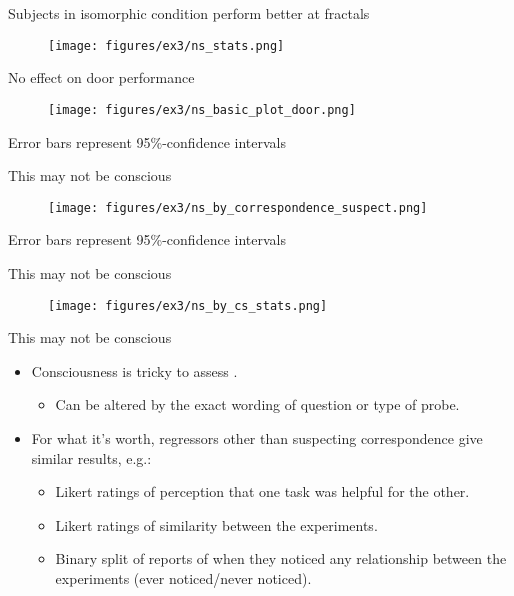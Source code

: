 \documentclass{beamer}
\begin{document}
\begin{frame}{Subjects in isomorphic condition perform better at fractals}
\begin{figure}
\centering
\texttt{[image: figures/ex3/ns\_stats.png]}
\end{figure}
\end{frame}

\begin{frame}{No effect on door performance}
\begin{figure}
\centering
\texttt{[image: figures/ex3/ns\_basic\_plot\_door.png]}
\end{figure}
{\scriptsize Error bars represent 95\%-confidence intervals}
\end{frame}

\begin{frame}{This may not be conscious}
\begin{figure}
\centering
\texttt{[image: figures/ex3/ns\_by\_correspondence\_suspect.png]}
\end{figure}
\vspace{-5pt}
{\scriptsize Error bars represent 95\%-confidence intervals}
\end{frame}

\begin{frame}{This may not be conscious}
\begin{figure}
\centering
\texttt{[image: figures/ex3/ns\_by\_cs\_stats.png]}
\end{figure}
\end{frame}

\begin{frame}{This may not be conscious}
\begin{itemize}
\item Consciousness is tricky to assess \citep{Newell2014}.
    \begin{itemize}
    \item<2-> Can be altered by the exact wording of question or type of probe.
    \end{itemize}
\item<3-> For what it's worth, regressors other than suspecting correspondence give similar results, e.g.:
    \begin{itemize}
    \item<4-> Likert ratings of perception that one task was helpful for the other. 
    \item<5-> Likert ratings of similarity between the experiments.
    \item<6-> Binary split of reports of when they noticed any relationship between the experiments (ever noticed/never noticed).
    \end{itemize}
\end{itemize}
\end{frame}
\end{document}

